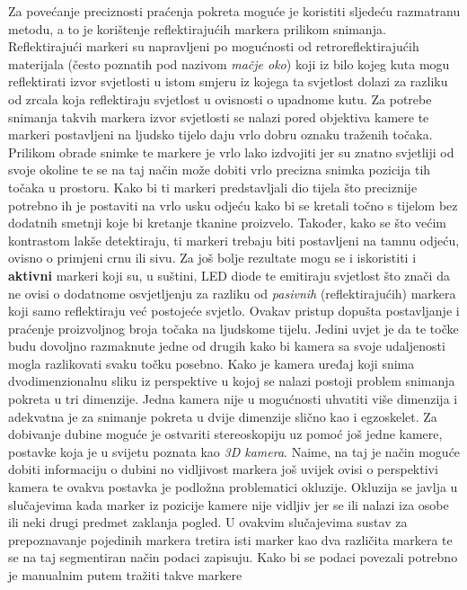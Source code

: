 \documentclass[times, utf8, diplomski]{fer}
\begin{document}
Za povećanje preciznosti praćenja pokreta moguće je koristiti sljedeću razmatranu metodu, a to je korištenje reflektirajućih markera
prilikom snimanja. Reflektirajući markeri su napravljeni po mogućnosti od retroreflektirajućih materijala (često poznatih pod nazivom
\textit{mačje oko}) koji iz bilo kojeg kuta
mogu reflektirati izvor svjetlosti u istom smjeru iz kojega ta svjetlost dolazi za razliku od zrcala koja reflektiraju svjetlost u ovisnosti o
upadnome kutu. Za potrebe snimanja takvih markera izvor svjetlosti se nalazi pored objektiva kamere te markeri postavljeni na
ljudsko tijelo daju vrlo dobru oznaku traženih točaka.
Prilikom obrade snimke te markere je vrlo lako izdvojiti jer su znatno svjetliji od svoje okoline te se na taj način može dobiti
vrlo precizna snimka pozicija tih točaka u prostoru. Kako bi ti markeri predstavljali dio tijela što preciznije potrebno ih je
postaviti na vrlo usku odjeću kako bi se kretali točno s tijelom bez dodatnih smetnji koje bi kretanje tkanine proizvelo. Također,
kako se što većim kontrastom lakše detektiraju, ti markeri trebaju biti postavljeni na tamnu odjeću, ovisno o primjeni crnu ili
sivu. Za još bolje rezultate mogu
se i iskoristiti i \textbf{aktivni} markeri koji su, u suštini, LED diode te emitiraju svjetlost što znači da ne ovisi o dodatnome
osvjetljenju za razliku od \textit{pasivnih} (reflektirajućih) markera koji samo reflektiraju već postojeće svjetlo. Ovakav pristup dopušta
postavljanje i praćenje proizvoljnog broja točaka na ljudskome tijelu. Jedini uvjet je da te točke budu dovoljno razmaknute jedne
od drugih kako bi kamera sa svoje udaljenosti mogla razlikovati svaku točku posebno. Kako je kamera uređaj koji snima dvodimenzionalnu
sliku iz perspektive u kojoj se nalazi postoji problem snimanja pokreta u tri dimenzije. Jedna kamera nije u mogućnosti uhvatiti
više dimenzija i adekvatna je za snimanje pokreta u dvije dimenzije slično kao i egzoskelet. Za dobivanje dubine moguće je ostvariti
stereoskopiju uz pomoć još jedne kamere, postavke koja je u svijetu poznata kao \textit{3D kamera}. Naime, na taj je način moguće
dobiti informaciju o dubini no vidljivost markera još uvijek ovisi o perspektivi kamera te ovakva postavka je podložna problematici
okluzije. Okluzija se javlja u slučajevima kada marker iz pozicije kamere nije vidljiv jer se ili nalazi iza osobe ili neki drugi
predmet zaklanja pogled. U ovakvim slučajevima sustav za prepoznavanje pojedinih markera tretira isti marker kao dva različita
markera te se na taj segmentiran način podaci zapisuju. Kako bi se podaci povezali potrebno je manualnim putem tražiti takve markere
\end{document}
